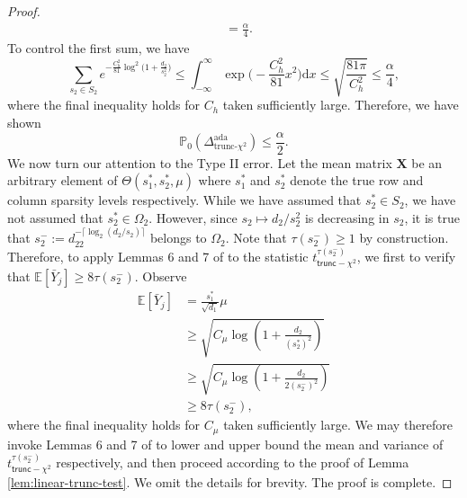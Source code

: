 \documentclass{article}
\newcommand{\bbP}{\mathbb{P}}
\newcommand{\EE}{\mathbb{E}}
\newcommand{\trunc}{\mathsf{trunc}}
\newcommand{\chisqlin}{\text{trunc-$\chi^2$}}
\theoremstyle{remark}
\begin{document}
\begin{proof}
\begin{align*}
    &= \frac{\alpha}{4}.
\end{align*}
To control the first sum, we have
\[\sum_{s_2 \in S_2}e^{-\frac{C^2_h}{81}\log^2\big(1 + \frac{d_2}{s_2^2}\big)} \leq \int_{-\infty}^{\infty}\exp\Big(-\frac{C_h^2}{81}x^2\Big)\text{d}x \leq \sqrt{\frac{81\pi}{C^2_h}} \leq \frac{\alpha}{4},\]
where the final inequality holds for $C_h$ taken sufficiently large. Therefore, we have shown
\[\bbP_0(\Delta^{\text{ada}}_{\chisqlin}) \leq \frac{\alpha}{2}.\]
We now turn our attention to the Type II error. Let the mean matrix $\mathbf{X}$ be an arbitrary element of $\Theta(s^*_1, s^*_2, \mu)$ where $s^*_1$ and $s^*_2$ denote the true row and column sparsity levels respectively. While we have assumed that $s_2^* \in S_2$, we have not assumed that $s_2^* \in \Omega_2$. However, since $s_2 \mapsto d_2 / s_2^2$ is decreasing in $s_2$, it is true that $s_2^- := d_22^{-\lceil \log_2(d_2/s_2)\rceil}$ belongs to $\Omega_2$. Note that $\tau(s_2^-) \geq 1$ by construction. Therefore, to apply Lemmas 6 and 7 of \citet{liu2021minimax} to the statistic $t^{\tau(s^-_2)}_{\trunc-\chi^2}$, we first to verify that $\EE[\bar{Y}_j] \geq 8\tau(s_2^-)$. Observe
\begin{align*}
    \EE[\bar{Y}_j] &= \frac{s_1^*}{\sqrt{d_1}}\mu \\
    &\geq \sqrt{C_\mu\log\left(1 + \frac{d_2}{(s_2^*)^2}\right)} \\
    &\geq \sqrt{C_\mu\log\left(1 + \frac{d_2}{2(s_2^-)^2}\right)} \\
    &\geq 8\tau(s_2^-),
\end{align*}
where the final inequality holds for $C_\mu$ taken sufficiently large. We may therefore invoke Lemmas 6 and 7 of \citet{liu2021minimax} to lower and upper bound the mean and variance of $t^{\tau(s^-_2)}_{\trunc-\chi^2}$ respectively, and then proceed according to the proof of Lemma \ref{lem:linear-trunc-test}. We omit the details for brevity. The proof is complete.
\end{proof}
\end{document}
